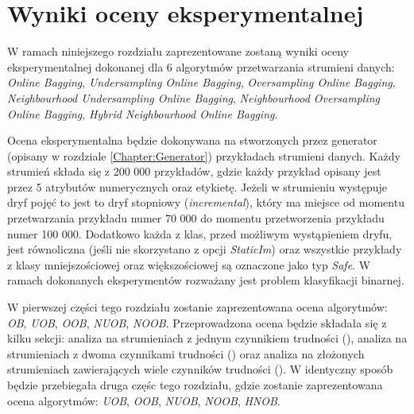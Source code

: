 \chapter{Wyniki oceny eksperymentalnej}
\label{Section:Results}

\noindent W ramach niniejszego rozdziału zaprezentowane zostaną wyniki oceny eksperymentalnej dokonanej dla 6 algorytmów przetwarzania strumieni danych: \textit{Online Bagging}, \textit{Undersampling Online Bagging}, \textit{Oversampling Online Bagging}, \textit{Neighbourhood Undersampling Online Bagging}, \textit{Neighbourhood Oversampling Online Bagging}, \textit{Hybrid Neighbourhood Online Bagging}.

Ocena eksperymentalna będzie dokonywana na stworzonych przez generator (opisany w rozdziale \ref{Chapter:Generator}) przykładach strumieni danych. Każdy strumień składa się z 200 000 przykładów, gdzie każdy przykład opisany jest przez 5 atrybutów numerycznych oraz etykietę. Jeżeli w strumieniu występuje dryf pojęć to jest to dryf stopniowy (\textit{incremental}), który ma miejsce od momentu przetwarzania przykładu numer 70 000 do momentu przetworzenia przykładu numer 100 000. Dodatkowo każda z klas, przed możliwym wystąpieniem dryfu, jest równoliczna (jeśli nie skorzystano z opcji \textit{StaticIm}) oraz wszystkie przykłady z klasy mniejszościowej oraz większościowej są oznaczone jako typ \textit{Safe}. W ramach dokonanych eksperymentów rozważany jest problem klasyfikacji binarnej.

W pierwszej części tego rozdziału zostanie zaprezentowana ocena algorytmów: \textit{OB}, \textit{UOB}, \textit{OOB}, \textit{NUOB}, \textit{NOOB}. Przeprowadzona ocena będzie składała się z kilku sekcji: analiza na strumieniach z jednym czynnikiem trudności (), analiza na strumieniach z dwoma czynnikami trudności () oraz analiza na złożonych strumieniach zawierających wiele czynników trudności (). W identyczny sposób będzie przebiegała druga częśc tego rozdziału, gdzie zostanie zaprezentowana ocena algorytmów: \textit{UOB}, \textit{OOB}, \textit{NUOB}, \textit{NOOB}, \textit{HNOB}.

